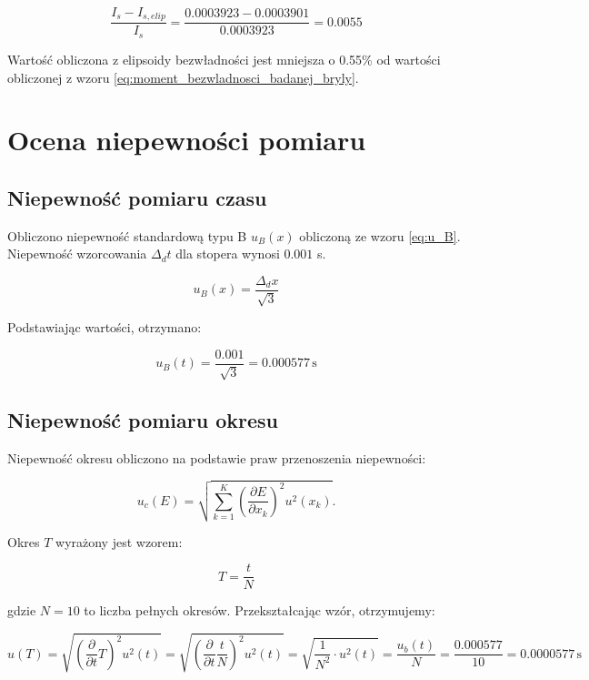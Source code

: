 \documentclass[a4paper,12pt]{article}
\begin{document}
\begin{equation*}
    \frac{I_s - I_{s,elip}}{I_s} = \frac{0.0003923 - 0.0003901}{0.0003923} = 0.0055
\end{equation*}

Wartość obliczona z elipsoidy bezwładności jest mniejsza o 0.55\% od wartości obliczonej z wzoru \eqref{eq:moment_bezwladnosci_badanej_bryly}.


\section{Ocena niepewności pomiaru}



\subsection*{Niepewność pomiaru czasu}

Obliczono niepewność standardową typu B  $u_B(x)$  obliczoną ze wzoru \ref{eq:u_B}. Niepewność wzorcowania $\Delta_d t$ dla stopera wynosi $0.001$ s.

\begin{equation}
    \label{eq:u_B}
    u_B(x) = \frac{\Delta_d x}{\sqrt{3}}
\end{equation}

Podstawiając wartości, otrzymano:

$$
    u_B(t) = \frac{0.001}{\sqrt{3}} = 0.000577\,\text{s}
$$

\subsection*{Niepewność pomiaru okresu}

Niepewność okresu obliczono na podstawie praw przenoszenia niepewności:

\begin{equation}
    \label{eq:niepewnosc_zlozona}
    u_c(E) = \sqrt{\sum_{k=1}^{K} \left( \frac{\partial E}{\partial x_k} \right)^2 u^2(x_k)}.
\end{equation}

Okres $T$ wyrażony jest wzorem:

\[
    T = \frac{t}{N}
\]

gdzie $N=10$ to liczba pełnych okresów. Przekształcając wzór, otrzymujemy:

\[
    u(T) = \sqrt{\left(\frac{\partial}{\partial t} T\right)^2 u^2(t)} = \sqrt{\left(\frac{\partial}{\partial t} \frac{t}{N}\right)^2 u^2(t)} = \sqrt{ \frac{1}{N^2} \cdot u^2(t)} = \frac{u_b(t)}{N} = \frac{0.000577}{10} = 0.0000577\,\text{s}
\]
\end{document}
